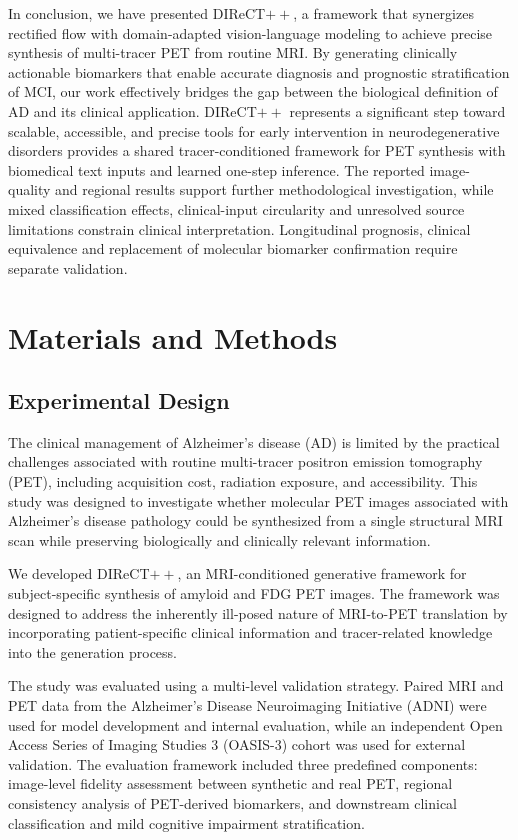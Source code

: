 \documentclass{article}
\providecommand{\DIFaddtex}[1]{{\protect\color{blue} \sf #1}} %
\providecommand{\DIFdeltex}[1]{{\protect\color{red} \scriptsize #1}} %
\providecommand{\DIFaddbegin}{} %
\providecommand{\DIFaddend}{} %
\providecommand{\DIFdelbegin}{} %
\providecommand{\DIFdelend}{} %
\providecommand{\DIFadd}[1]{\texorpdfstring{\DIFaddtex{#1}}{#1}} %
\providecommand{\DIFdel}[1]{\texorpdfstring{\DIFdeltex{#1}}{}} %
\newcommand{\DIFscaledelfig}{0.5}
\newlength{\DIFdelgraphicswidth} %
\newlength{\DIFdelgraphicsheight} %
\newcommand{\DIFaddincludegraphics}[2][]{{\color{blue}\fbox{\DIFOincludegraphics[#1]{#2}}}} %
\newcommand{\DIFdelincludegraphics}[2][]{%
\sbox{\DIFdelgraphicsbox}{\DIFOincludegraphics[#1]{#2}}%
\settoboxwidth{\DIFdelgraphicswidth}{\DIFdelgraphicsbox} %
\settoboxtotalheight{\DIFdelgraphicsheight}{\DIFdelgraphicsbox} %
\scalebox{\DIFscaledelfig}{%
\parbox[b]{\DIFdelgraphicswidth}{\usebox{\DIFdelgraphicsbox}\\[-\baselineskip] \rule{\DIFdelgraphicswidth}{0em}}\llap{\resizebox{\DIFdelgraphicswidth}{\DIFdelgraphicsheight}{%
\setlength{\unitlength}{\DIFdelgraphicswidth}%
\begin{picture}(1,1)%
\thicklines\linethickness{2pt} %
{\color[rgb]{1,0,0}\put(0,0){\framebox(1,1){}}}%
{\color[rgb]{1,0,0}\put(0,0){\line( 1,1){1}}}%
{\color[rgb]{1,0,0}\put(0,1){\line(1,-1){1}}}%
\end{picture}%
}\hspace*{3pt}}} %
} %
\DeclareRobustCommand{\DIFaddbegin}{\DIFOaddbegin \let\includegraphics\DIFaddincludegraphics} %
\DeclareRobustCommand{\DIFaddend}{\DIFOaddend \let\includegraphics\DIFOincludegraphics} %
\DeclareRobustCommand{\DIFdelbegin}{\DIFOdelbegin \let\includegraphics\DIFdelincludegraphics} %
\DeclareRobustCommand{\DIFdelend}{\DIFOaddend \let\includegraphics\DIFOincludegraphics} %
\begin{document}
In conclusion, \DIFdelbegin \DIFdel{we have presented DIReCT$++$, a framework that synergizes rectified flow with domain-adapted vision-language modeling to achieve precise synthesis of multi-tracer PET from routine MRI. By generating clinically actionable biomarkers that enable accurate diagnosis and prognostic stratification of MCI, our work effectively bridges the gap between the biological definition of AD and its clinical application. }\DIFdelend DIReCT$++$ \DIFdelbegin \DIFdel{represents a significant step toward scalable, accessible, and precise tools for early intervention in neurodegenerative disorders}\DIFdelend \DIFaddbegin \DIFadd{provides a shared tracer-conditioned framework for PET synthesis with biomedical text inputs and learned one-step inference. The reported image-quality and regional results support further methodological investigation, while mixed classification effects, clinical-input circularity and unresolved source limitations constrain clinical interpretation. Longitudinal prognosis, clinical equivalence and replacement of molecular biomarker confirmation require separate validation}\DIFaddend .



\section{Materials and Methods}
\subsection{Experimental Design}

The clinical management of Alzheimer's disease (AD) is limited by the
practical challenges associated with routine multi-tracer positron emission
tomography (PET), including acquisition cost, radiation exposure, and
accessibility. This study was designed to investigate whether molecular PET
images associated with Alzheimer's disease pathology could be synthesized
from a single structural MRI scan while preserving biologically and
clinically relevant information.

We developed DIReCT$++$, an MRI-conditioned generative framework for
subject-specific synthesis of amyloid and FDG PET images. The framework was
designed to address the inherently ill-posed nature of MRI-to-PET translation
by incorporating patient-specific clinical information and tracer-related
knowledge into the generation process.

The study was evaluated using a multi-level validation strategy. Paired MRI
and PET data from the Alzheimer's Disease Neuroimaging Initiative (ADNI) were
used for model development and internal evaluation, while an independent
Open Access Series of Imaging Studies 3 (OASIS-3) cohort was used for
external validation. The evaluation framework included three predefined
components: image-level fidelity assessment between synthetic and real PET,
regional consistency analysis of PET-derived biomarkers, and downstream
clinical classification and mild cognitive impairment stratification.
\end{document}
